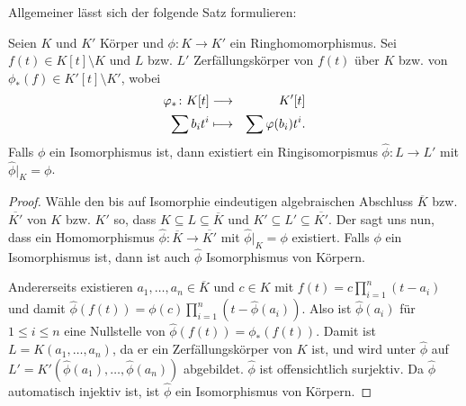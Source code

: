 \documentclass[12pt,a4paper]{scrartcl}
\begin{document}
Allgemeiner lässt sich der folgende Satz formulieren:
\begin{satz} \label{thm:18.6}
	Seien $K$ und $K'$ Körper und $\phi\colon K\to K'$ ein Ringhomomorphismus. Sei $f(t)\in K[t]\setminus K$ und $L$ bzw. $L'$ Zerfällungskörper von $f(t)$ über $K$ bzw. von $\phi_{*}(f)\in K'[t]\setminus K'$, wobei 
	\begin{eqnarray*}
		\varphi_{*}\colon K[t] & \longrightarrow & K'[t]\\
		\sum b_it^i & \longmapsto & \sum \varphi(b_i)t^i.
	\end{eqnarray*}
	Falls $\phi$ ein Isomorphismus ist, dann existiert ein Ringisomorpismus $\hat \phi\colon L\to L'$ mit $\hat\phi|_K = \phi$.
\end{satz}
\begin{proof}
	Wähle den bis auf Isomorphie eindeutigen algebraischen Abschluss $\overline{K}$ bzw. $\overline{K'}$ von $K$ bzw. $K'$ so, dass $K\subseteq L\subseteq \overline{K}$ und $K'\subseteq L'\subseteq \overline{K'}$. Der  sagt uns nun, dass ein Homomorphismus $\hat\phi\colon \overline{K}\to\overline{K'}$ mit $\hat\phi|_K = \phi$ existiert. Falls $\phi$ ein Isomorphismus ist, dann ist auch $\hat\phi$ Isomorphismus von Körpern.
	
	Andererseits existieren $a_1,\dots, a_n\in \overline{K}$ und $c\in K$ mit $f(t) = c\prod_{i = 1}^n(t-a_i)$ und damit $\hat\phi(f(t)) = \phi(c)\prod_{i = 1}^n(t-\hat\phi(a_i))$. Also ist $\hat\phi(a_i)$ für $1\leq i\leq n$ eine Nullstelle von $\hat\phi(f(t)) = \phi_{*}(f(t))$. Damit ist $L = K(a_1,\dots, a_n)$, da er ein Zerfällungskörper von $K$ ist, und wird unter $\hat\phi$ auf $L' = K'(\hat\phi(a_1),\dots ,\hat\phi(a_n))$ abgebildet. $\hat{\phi}$ ist offensichtlich surjektiv. Da $\hat{\phi}$ automatisch injektiv ist, ist $\hat\phi$ ein Isomorphismus von Körpern.
\end{proof}
\end{document}
